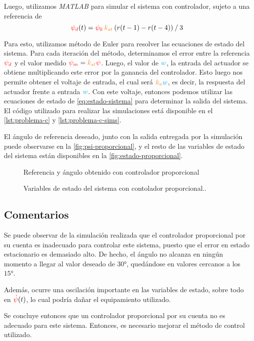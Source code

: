 Luego, utilizamos \textit{MATLAB} para simular el sistema con controlador, sujeto
a una referencia de
\begin{equation}
	\rojo{\psi_{d}}(t) = \rojo{\psi_{0}}\nara{k_{st}}\left(r(t-1) - r(t-4)\right) \mathbin{/} 3
\end{equation}

Para esto, utilizamos método de Euler para resolver las ecuaciones de estado
del sistema. Para cada iteración del método, determinamos el error entre la
referencia $\mathbin{\color{red}\psi_{d}}$ y el valor medido $\rojo{\psi_{m}} = \nara{k_{st}}\rojo{\psi}$.
Luego, el valor de $\mathbin{\color{cyan}w}$, la entrada del actuador se obtiene multiplicando
este error por la ganancia del controlador. Esto luego nos permite obtener el
voltaje de entrada, el cual será $\nara{k_{a}}\azul{w}$, es decir, la respuesta del
actuador frente a entrada $\mathbin{\color{cyan}w}$. Con este voltaje, entonces podemos utilizar
las ecuaciones de estado de \eqref{eq:estado-sistema} para determinar la salida del
sistema. El código utilizado para realizar las simulaciones está disponible en
el \autoref{lst:problema-c} y \autoref{lst:problema-c-sims}.

El ángulo de referencia deseado, junto con la salida entregada por la simulación
puede observarse en la \autoref{fig:psi-proporcional}, y el resto de las variables
de estado del sistema están disponibles en la \autoref{fig:estado-proporcional}.

\begin{figure}[h]
  \centering
  
  \caption{Referencia y ángulo obtenido con controlador proporcional}\label{fig:psi-proporcional}
\end{figure}

\begin{figure}[h]
  \centering
  
  \caption{Variables de estado del sistema con contolador proporcional..}\label{fig:estado-proporcional}
\end{figure}

\subsection{Comentarios}

Se puede observar de la simulación realizada que el controlador proporcional por
su cuenta es inadecuado para controlar este sistema, puesto que el error en estado
estacionario es demasiado alto. De hecho, el ángulo no alcanza en ningún momento
a llegar al valor deseado de $\ang{30}$, quedándose en valores cercanos a los $\ang{15}$.

Además, ocurre una oscilación importante en las variables de estado, sobre todo
en $\mathbin{\color{red}\dot\psi}(t)$, lo cual podría dañar el equipamiento utilizado.

Se concluye entonces que un controlador proporcional por su cuenta no es adecuado
para este sistema. Entonces, es necesario mejorar el método de control utilizado.
